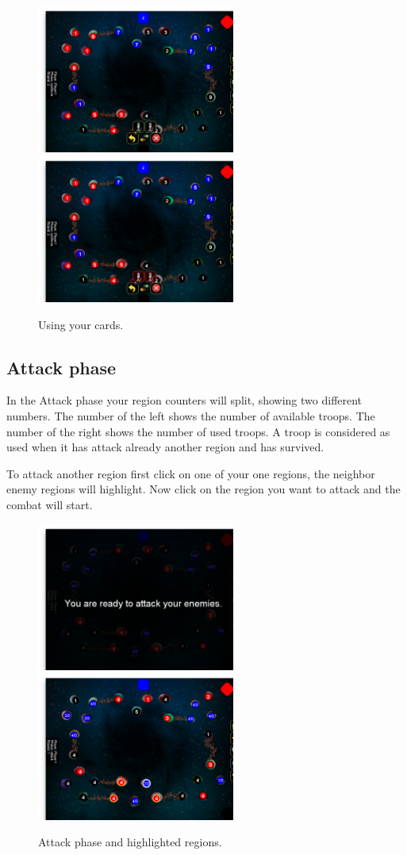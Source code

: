 \documentclass[12pt,a4paper]{article}
\begin{document}
\begin{figure}[h!]
\centering
\includegraphics[width=6.5cm]{pic/screenshot05.png}
\includegraphics[width=6.5cm]{pic/screenshot06.png}
\caption{Using your cards.}
\label{fig:usecard}
\end{figure}

\subsection{Attack phase}
In the Attack phase your region counters will split, showing two different numbers. The number of the left shows the number of available troops. The number of the right shows the number of used troops. A troop is considered as used when it has attack already another region and has survived.

To attack another region first click on one of your one regions, the neighbor enemy regions will highlight. Now click on the region you want to attack and the combat will start.

\begin{figure}[h!]
\centering
\includegraphics[width=6.5cm]{pic/screenshot07.png}
\includegraphics[width=6.5cm]{pic/screenshot08.png}
\caption{Attack phase and highlighted regions.}
\label{fig:attack}
\end{figure}
\end{document}
